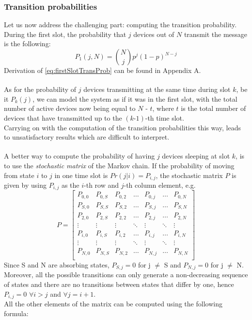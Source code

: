 \subsubsection{Transition probabilities}
Let us now address the challenging part: computing the transition probability.\\
During the first slot, the probability that $j$ devices out of $N$ transmit
the message is the following:
\begin{equation}
	P_{1}(j, N) = {N \choose j} p^{j} (1 - p)^{N - j}
	\label{eq:firstSlotTransProb}
\end{equation}
Derivation of \ref{eq:firstSlotTransProb} can be found in Appendix A.\\
\\
As for the probability of $j$ devices transmitting at the same time during slot
$k$, be it $P_{k}(j)$, we can model the system as if it was in the first slot,
with the total number of active devices now being equal to $N$ - $t$, where $t$
is the total number of devices that have transmitted up to the $(k\text{-}1)$-th
time slot.\\
Carrying on with the computation of the transition probabilities this way, leads
to unsatisfactory results which are difficult to interpret.\\
\\
A better way to compute the probability of having $j$ devices sleeping at
slot $k$, is to use the \textit{stochastic matrix} of the Markov chain. If the
probability of moving from state $i$ to $j$ in one time slot is
$Pr(j|i) = P_{i,j}$, the stochastic matrix $P$ is given by using
$P_{i,j}$ as the $i$-th row and $j$-th column element, e.g.
\begin{equation*}
P = 
\begin{bmatrix}
P_{0,0}	& P_{0,S}	& P_{0,2}	& \dots  	& P_{0,j}	& \dots		& P_{0,N} \\
P_{S,0}	& P_{S,S}	& P_{S,2}	& \dots  	& P_{S,j}	& \dots		& P_{S,N} \\
P_{2,0}	& P_{2,S}	& P_{2,2}	& \dots  	& P_{2,j}	& \dots		& P_{2,N} \\
\vdots	& \vdots	& \vdots	& \ddots 	& \vdots	& \ddots	& \vdots \\
P_{i,0}	& P_{i,S}	& P_{i,2}	& \dots		& P_{i,j}	& \dots		& P_{i,N} \\
\vdots	& \vdots	& \vdots	& \ddots	& \vdots	& \ddots	& \vdots \\
P_{N,0}	& P_{N,S}	& P_{N,2}	& \dots		& P_{N,j}	& \dots		& P_{N,N} \\
\end{bmatrix}
\label{stochasticMatrix1}
\end{equation*}
\hfill \break
Since S and N are absorbing states, $P_{S,j}=0$ for j $\neq$ S and $P_{N,j}=0$ for j $\neq$ N.\\
Moreover, all the possible transitions can only generate a non-decreasing sequence of states and there are no transitions between states that differ by one, hence $P_{i, j} = 0 $ $ \forall i > j $ and $\forall j = i + 1$.\\
All the other elements of the matrix can be computed using the following formula:


